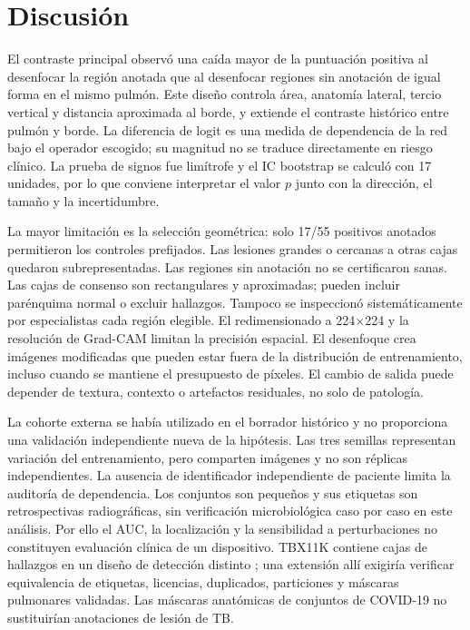 \documentclass[conference]{IEEEtran}
\begin{document}
\section{Discusión}
El contraste principal observó una caída mayor de la puntuación positiva al desenfocar la región anotada que al desenfocar regiones sin anotación de igual forma en el mismo pulmón. Este diseño controla área, anatomía lateral, tercio vertical y distancia aproximada al borde, y extiende el contraste histórico entre pulmón y borde. La diferencia de logit es una medida de dependencia de la red bajo el operador escogido; su magnitud no se traduce directamente en riesgo clínico. La prueba de signos fue limítrofe y el IC bootstrap se calculó con 17 unidades, por lo que conviene interpretar el valor $p$ junto con la dirección, el tamaño y la incertidumbre.

La mayor limitación es la selección geométrica: solo 17/55 positivos anotados permitieron los controles prefijados. Las lesiones grandes o cercanas a otras cajas quedaron subrepresentadas. Las regiones sin anotación no se certificaron sanas. Las cajas de consenso son rectangulares y aproximadas; pueden incluir parénquima normal o excluir hallazgos. Tampoco se inspeccionó sistemáticamente por especialistas cada región elegible. El redimensionado a 224$\times$224 y la resolución de Grad-CAM limitan la precisión espacial. El desenfoque crea imágenes modificadas que pueden estar fuera de la distribución de entrenamiento, incluso cuando se mantiene el presupuesto de píxeles. El cambio de salida puede depender de textura, contexto o artefactos residuales, no solo de patología.

La cohorte externa se había utilizado en el borrador histórico y no proporciona una validación independiente nueva de la hipótesis. Las tres semillas representan variación del entrenamiento, pero comparten imágenes y no son réplicas independientes. La ausencia de identificador independiente de paciente limita la auditoría de dependencia. Los conjuntos son pequeños y sus etiquetas son retrospectivas radiográficas, sin verificación microbiológica caso por caso en este análisis. Por ello el AUC, la localización y la sensibilidad a perturbaciones no constituyen evaluación clínica de un dispositivo. TBX11K contiene cajas de hallazgos en un diseño de detección distinto \cite{liu2020}; una extensión allí exigiría verificar equivalencia de etiquetas, licencias, duplicados, particiones y máscaras pulmonares validadas. Las máscaras anatómicas de conjuntos de COVID-19 no sustituirían anotaciones de lesión de TB.
\end{document}
